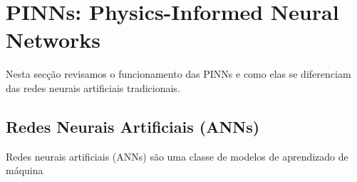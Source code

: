 \section{PINNs: Physics-Informed Neural Networks}

Nesta
secção revisamos o funcionamento 
das PINNs e como elas se diferenciam das redes neurais artificiais tradicionais.

\subsection{Redes Neurais Artificiais (ANNs)}

Redes neurais artificiais (ANNs) são uma classe de modelos de aprendizado de máquina \cite{mu_sun_2022}
